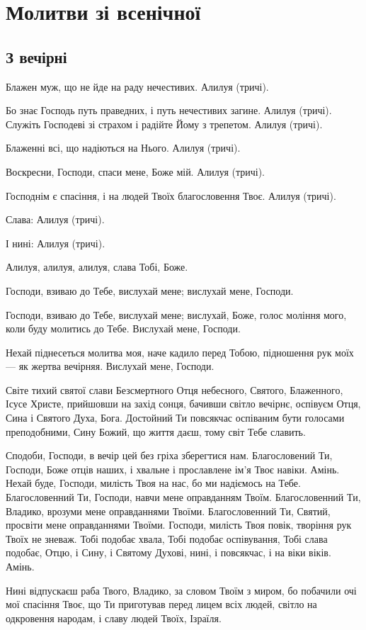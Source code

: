\documentclass[chapters.tex]{subfiles}
\begin{document}
\chapter{Молитви зі всенічної}
\section{З вечірні}
Блажен муж, що не йде на раду нечестивих. Алилуя (тричі).

Бо знає Господь путь праведних, і путь нечестивих загине. Алилуя (тричі). Служіть Господеві зі страхом і радійте Йому з трепетом. Алилуя (тричі).

Блаженні всі, що надіються на Нього. Алилуя (тричі).

Воскресни, Господи, спаси мене, Боже мій. Алилуя (тричі).

Господнім є спасіння, і на людей Твоїх благословення Твоє. Алилуя (тричі).

Слава: Алилуя (тричі).

І нині: Алилуя (тричі).

Алилуя, алилуя, алилуя, слава Тобі, Боже.

Господи, взиваю до Тебе, вислухай мене; вислухай мене, Господи.

Господи, взиваю до Тебе, вислухай мене; вислухай, Боже, голос моління мого, коли буду молитись до Тебе. Вислухай мене, Господи.

Нехай піднесеться молитва моя, наче кадило перед Тобою, підношення рук моїх — як жертва вечірняя. Вислухай мене, Господи.

Світе тихий святої слави Безсмертного Отця небесного, Святого, Блаженного, Ісусе Христе, прийшовши на захід сонця, бачивши світло вечірнє, оспівуєм Отця, Сина і Святого Духа, Бога. Достойний Ти повсякчас оспіваним бути голосами преподобними, Сину Божий, що життя даєш, тому світ Тебе славить.

Сподоби, Господи, в вечір цей без гріха зберегтися нам. Благословений Ти, Господи, Боже отців наших, і хвальне і прославлене ім’я Твоє навіки. Амінь. Нехай буде, Господи, милість Твоя на нас, бо ми надіємось на Тебе. Благословенний Ти, Господи, навчи мене оправданням Твоїм. Благословенний Ти, Владико, врозуми мене оправданнями Твоїми. Благословенний Ти, Святий, просвіти мене оправданнями Твоїми. Господи, милість Твоя повік, творіння рук Твоїх не зневаж. Тобі подобає хвала, Тобі подобає оспівування, Тобі слава подобає, Отцю, і Сину, і Святому Духові, нині, і повсякчас, і на віки віків. Амінь.

Нині відпускаєш раба Твого, Владико, за словом Твоїм з миром, бо побачили очі мої спасіння Твоє, що Ти приготував перед лицем всіх людей, світло на одкровення народам, і славу людей Твоїх, Ізраїля.
\end{document}

